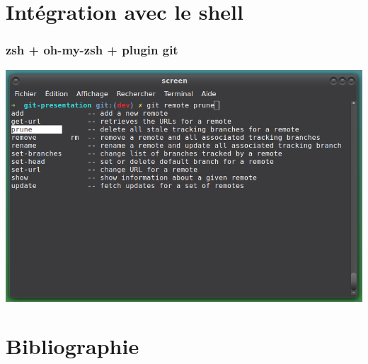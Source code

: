 \documentclass[t,11pt]{beamer}
\begin{document}
\section{Int\'egration avec le shell}
\begin{frame}
        \frametitle{zsh + oh-my-zsh + plugin git}
        \centering
        \includegraphics[width=\linewidth,height=0.8\textheight,keepaspectratio]{./img/zsh-git}
        
\end{frame}

\section{Bibliographie}
\end{document}
